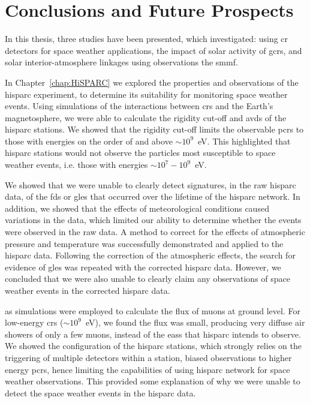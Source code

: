 \chapter{Conclusions and Future Prospects}\label{chap:conc}

In this thesis, three studies have been presented, which investigated: using \gls{cr} detectors for space weather applications, the impact of solar activity of \glspl{gcr}, and solar interior-atmosphere linkages using observations the \gls{smmf}. %

In Chapter~\ref{chap:HiSPARC} we explored the properties and observations of the \gls{hisparc} experiment, to determine its suitability for monitoring space weather events. Using simulations of the interactions between \glspl{cr} and the Earth's magnetosphere, we were able to calculate the rigidity cut-off and \glspl{avd} of the \gls{hisparc} stations. We showed that the rigidity cut-off limits the observable \glspl{pcr} to those with energies on the order of and above $\sim 10^9$~eV. This highlighted that \gls{hisparc} stations would not observe the particles most susceptible to space weather events, i.e. those with energies $\sim 10^7-10^9$~eV.

We showed that we were unable to clearly detect signatures, in the raw \gls{hisparc} data, of the \glspl{fd} or \glspl{gle} that occurred over the lifetime of the \gls{hisparc} network. In addition, we showed that the effects of meteorological conditions caused variations in the data, which limited our ability to determine whether the events were observed in the raw data. A method to correct for the effects of atmospheric pressure and temperature was successfully demonstrated and applied to the \gls{hisparc} data. Following the correction of the atmospheric effects, the search for evidence of \glspl{gle} was repeated with the corrected \gls{hisparc} data. However, we concluded that we were also unable to clearly claim any observations of space weather events in the corrected \gls{hisparc} data.

\gls{as} simulations were employed to calculate the flux of muons at ground level. For low-energy \glspl{cr} ($\sim 10^9$~eV), we found the flux was small, producing very diffuse air showers of only a few muons, instead of the \glspl{eas} that \gls{hisparc} intends to observe. We showed the configuration of the \gls{hisparc} stations, which strongly relies on the triggering of multiple detectors within a station, biased observations to higher energy \glspl{pcr}, hence limiting the capabilities of using \gls{hisparc} network for space weather observations. This provided some explanation of why we were unable to detect the space weather events in the \gls{hisparc} data.

